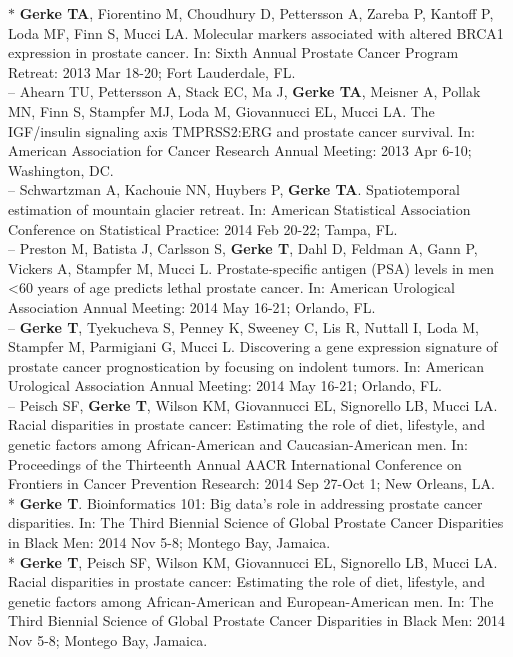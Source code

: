\documentclass[11pt, a4paper]{article} %
\begin{document}
$*$ {\bf Gerke TA}, Fiorentino M, Choudhury D, Pettersson A, Zareba P, Kantoff P, Loda MF, Finn S, Mucci LA. Molecular markers associated with altered BRCA1 expression in prostate cancer. In: Sixth Annual Prostate Cancer Program Retreat: 2013 Mar 18-20; Fort Lauderdale, FL.\\

-- Ahearn TU, Pettersson A, Stack EC, Ma J, {\bf Gerke TA}, Meisner A, Pollak MN, Finn S, Stampfer MJ, Loda M, Giovannucci EL, Mucci LA.  The IGF/insulin signaling axis TMPRSS2:ERG and prostate cancer survival.  In: American Association for Cancer Research Annual Meeting: 2013 Apr 6-10; Washington, DC.\\

-- Schwartzman A, Kachouie NN, Huybers P, {\bf Gerke TA}. Spatiotemporal estimation of mountain glacier retreat. In: American Statistical Association Conference on Statistical Practice: 2014 Feb 20-22; Tampa, FL.\\

-- Preston M, Batista J, Carlsson S, {\bf Gerke T}, Dahl D, Feldman A, Gann P, Vickers A, Stampfer M, Mucci L. Prostate-specific antigen (PSA) levels in men <60 years of age predicts lethal prostate cancer. In: American Urological Association Annual Meeting: 2014 May 16-21; Orlando, FL.\\

-- {\bf Gerke T}, Tyekucheva S, Penney K, Sweeney C, Lis R, Nuttall I, Loda M, Stampfer M, Parmigiani G, Mucci L. Discovering a gene expression signature of prostate cancer prognostication by focusing on indolent tumors. In: American Urological Association Annual Meeting: 2014 May 16-21; Orlando, FL.\\

-- Peisch SF, {\bf Gerke T}, Wilson KM, Giovannucci EL, Signorello LB, Mucci LA. Racial disparities in prostate cancer: Estimating the role of diet, lifestyle, and genetic factors among African-American and Caucasian-American men. In: Proceedings of the Thirteenth Annual AACR International Conference on Frontiers in Cancer Prevention Research: 2014 Sep 27-Oct 1; New Orleans, LA.\\

* {\bf Gerke T}. Bioinformatics 101: Big data's role in addressing prostate cancer disparities. In: The Third Biennial Science of Global Prostate Cancer Disparities in Black Men: 2014 Nov 5-8; Montego Bay, Jamaica.\\

* {\bf Gerke T}, Peisch SF, Wilson KM, Giovannucci EL, Signorello LB, Mucci LA. Racial disparities in prostate cancer: Estimating the role of diet, lifestyle, and genetic factors among African-American and European-American men. In: The Third Biennial Science of Global Prostate Cancer Disparities in Black Men: 2014 Nov 5-8; Montego Bay, Jamaica.\\
\end{document}
